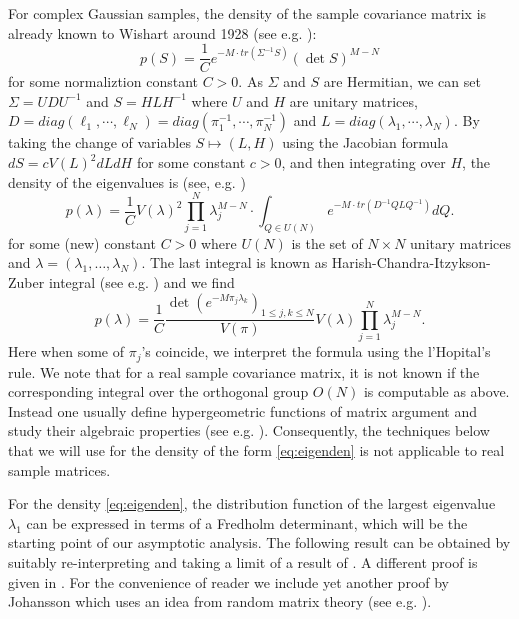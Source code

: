 \documentclass[11pt]{article}
\begin{document}
For complex Gaussian samples, the density of the sample covariance
matrix is already known to Wishart around 1928 (see e.g.
\cite{Muirhead}):
\begin{equation}
  p(S) = \frac{1}{C} e^{-M \cdot tr(\Sigma^{-1} S)} (\det
  S)^{M-N}
\end{equation}
for some normaliztion constant $C>0$. As $\Sigma$ and $S$ are
Hermitian, we can set $\Sigma=UDU^{-1}$ and $S=HLH^{-1}$ where $U$
and $H$ are unitary matrices, $D= diag(\ell_1, \cdots, \ell_N)
=diag(\pi_1^{-1},\cdots, \pi_N^{-1})$ and $L =
diag(\lambda_1,\cdots, \lambda_N)$. By taking the change of
variables $S \mapsto (L,H)$ using the Jacobian formula $dS=
cV(L)^2dLdH$ for some constant $c>0$, and then integrating over
$H$, the density of the eigenvalues is (see, e.g.
\cite{JamesAnn35})
\begin{equation}\label{eq:eigendenoverU}
  p(\lambda) = \frac1{C} V(\lambda)^2 \prod_{j=1}^N
  \lambda_j^{M-N} \cdot
  \int_{Q\in U(N)} e^{-M\cdot tr(D^{-1}QLQ^{-1})} dQ.
\end{equation}
for some (new) constant $C>0$ where $U(N)$ is the set of $N\times
N$ unitary matrices and $\lambda=(\lambda_1,\dots, \lambda_N)$.
The last integral is known as Harish-Chandra-Itzykson-Zuber
integral (see e.g. \cite{Mehta}) and we find
\begin{equation}\label{eq:eigenden}
  p(\lambda) = \frac1{C}
  \frac{\det(e^{-M\pi_j\lambda_k})_{1\le j,k\le N}}{V(\pi)}
  V(\lambda)
  \prod_{j=1}^N  \lambda_j^{M-N}.
\end{equation}
Here when some of $\pi_j$'s coincide, we interpret the formula
using the l'Hopital's rule. We note that for a real sample
covariance matrix, it is not known if the corresponding integral
over the orthogonal group $O(N)$ is computable as above. Instead
one usually define hypergeometric functions of matrix argument and
study their algebraic properties (see e.g. \cite{Muirhead}).
Consequently, the techniques below that we will use for the
density of the form \eqref{eq:eigenden} is not applicable to real
sample matrices.

For the density \eqref{eq:eigenden}, the distribution function of
the largest eigenvalue $\lambda_1$  can be expressed in terms of a
Fredholm determinant, which will be the starting point of our
asymptotic analysis. The following result can be obtained by
suitably re-interpreting and taking a limit of a result of
\cite{Okounkov}. A different proof is given in \cite{Sandrine}.
For the convenience of reader we include yet another proof by
Johansson \cite{Joh:unp} which uses an idea from random matrix
theory (see e.g. \cite{TW2}).
\end{document}
